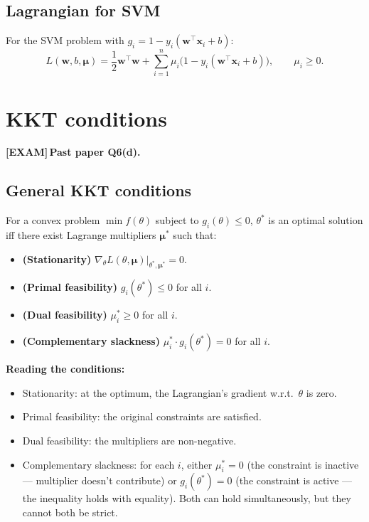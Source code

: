 \documentclass[11pt, a4paper]{article}
\newcommand{\examflag}{\textcolor{tipBd}{\textbf{[EXAM]}}\,}
\begin{document}
\subsection{Lagrangian for SVM}

For the SVM problem with $g_i = 1 - y_i(\mathbf{w}^\top\mathbf{x}_i + b)$:
\[
\boxed{\;L(\mathbf{w}, b, \boldsymbol\mu) = \frac{1}{2}\mathbf{w}^\top\mathbf{w} + \sum_{i=1}^n \mu_i\big(1 - y_i(\mathbf{w}^\top\mathbf{x}_i + b)\big), \qquad \mu_i \ge 0.\;}
\]

\section{KKT conditions}

\examflag{}\textbf{Past paper Q6(d).}

\subsection{General KKT conditions}

\begin{defbox}
For a convex problem $\min f(\theta)$ subject to $g_i(\theta) \le 0$, $\theta^*$ is an optimal solution iff there exist Lagrange multipliers $\boldsymbol\mu^*$ such that:
\begin{itemize}
  \item \textbf{(Stationarity)} $\nabla_\theta L(\theta, \boldsymbol\mu)\big|_{\theta^*, \boldsymbol\mu^*} = 0$.
  \item \textbf{(Primal feasibility)} $g_i(\theta^*) \le 0$ for all $i$.
  \item \textbf{(Dual feasibility)} $\mu_i^* \ge 0$ for all $i$.
  \item \textbf{(Complementary slackness)} $\mu_i^* \cdot g_i(\theta^*) = 0$ for all $i$.
\end{itemize}
\end{defbox}

\textbf{Reading the conditions:}
\begin{itemize}
  \item Stationarity: at the optimum, the Lagrangian's gradient w.r.t.\ $\theta$ is zero.
  \item Primal feasibility: the original constraints are satisfied.
  \item Dual feasibility: the multipliers are non-negative.
  \item Complementary slackness: for each $i$, either $\mu_i^* = 0$ (the constraint is inactive — multiplier doesn't contribute) or $g_i(\theta^*) = 0$ (the constraint is active — the inequality holds with equality). Both can hold simultaneously, but they cannot both be strict.
\end{itemize}
\end{document}

